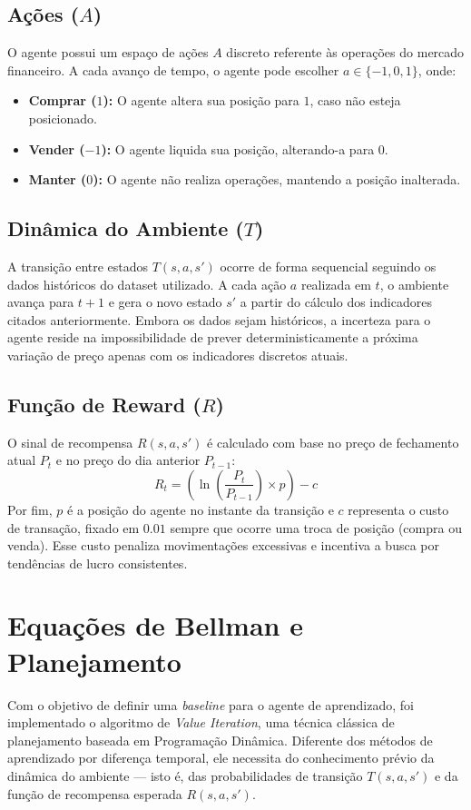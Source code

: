 \documentclass{article}
\begin{document}
\subsection{Ações ($A$)}
O agente possui um espaço de ações $A$ discreto referente às operações do mercado financeiro. A cada avanço de tempo, o agente pode escolher $a \in \{-1, 0, 1\}$, onde:
\begin{itemize}
    \item \textbf{Comprar ($1$):} O agente altera sua posição para $1$, caso não esteja posicionado.
    \item \textbf{Vender ($-1$):} O agente liquida sua posição, alterando-a para $0$.
    \item \textbf{Manter ($0$):} O agente não realiza operações, mantendo a posição inalterada.
\end{itemize}

\subsection{Dinâmica do Ambiente ($T$)}
A transição entre estados $T(s, a, s')$ ocorre de forma sequencial seguindo os dados históricos do dataset utilizado. A cada ação $a$ realizada em $t$, o ambiente avança para $t+1$ e gera o novo estado $s'$ a partir do cálculo dos indicadores citados anteriormente. Embora os dados sejam históricos, a incerteza para o agente reside na impossibilidade de prever deterministicamente a próxima variação de preço apenas com os indicadores discretos atuais.

\subsection{Função de Reward ($R$)}
O sinal de recompensa $R(s, a, s')$ é calculado com base no preço de fechamento atual $P_t$ e no preço do dia anterior $P_{t-1}$:
\begin{equation}
    R_t = \left( \ln\left(\frac{P_t}{P_{t-1}}\right) \times p \right) - c
\end{equation}
Por fim, $p$ é a posição do agente no instante da transição e $c$ representa o custo de transação, fixado em $0.01$ sempre que ocorre uma troca de posição (compra ou venda). Esse custo penaliza movimentações excessivas e incentiva a busca por tendências de lucro consistentes.

\section{Equações de Bellman e Planejamento}
Com o objetivo de definir uma \textit{baseline} para o agente de aprendizado, foi implementado o algoritmo de \textit{Value Iteration}, uma técnica clássica de planejamento baseada em Programação Dinâmica. Diferente dos métodos de aprendizado por diferença temporal, ele necessita do conhecimento prévio da dinâmica do ambiente — isto é, das probabilidades de transição $T(s, a, s')$ e da função de recompensa esperada $R(s, a, s')$.
\end{document}

